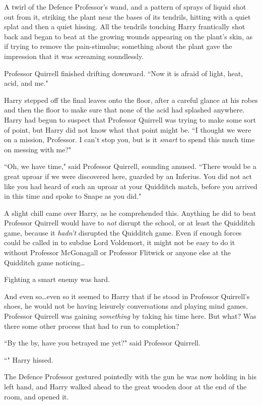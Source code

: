 A twirl of the Defence Professor's wand, and a pattern of sprays of liquid shot out from it, striking the plant near the bases of its tendrils, hitting with a quiet splat and then a quiet hissing. All the tendrils touching Harry frantically shot back and began to beat at the growing wounds appearing on the plant's skin, as if trying to remove the pain-stimulus; something about the plant gave the impression that it was screaming soundlessly.

Professor Quirrell finished drifting downward. ``Now it is afraid of light, heat, acid, and me."

Harry stepped off the final leaves onto the floor, after a careful glance at his robes and then the floor to make sure that none of the acid had splashed anywhere. Harry had begun to suspect that Professor Quirrell was trying to make some sort of point, but Harry did not know what that point might be. ``I thought we were on a mission, Professor. I can't stop you, but is it \emph{smart} to spend this much time on messing with me?"

``Oh, we have time," said Professor Quirrell, sounding amused. ``There would be a great uproar if we were discovered here, guarded by an Inferius. You did not act like you had heard of such an uproar at your Quidditch match, before you arrived in this time and spoke to Snape as you did."

A slight chill came over Harry, as he comprehended this. Anything he did to beat Professor Quirrell would have to \emph{not} disrupt the school, or at least the Quidditch game, because it \emph{hadn't} disrupted the Quidditch game. Even if enough forces could be called in to subdue Lord Voldemort, it might not be easy to do it without Professor McGonagall or Professor Flitwick or anyone else at the Quidditch game noticing…

Fighting a smart enemy was hard.

And even so…even so it seemed to Harry that if he stood in Professor Quirrell's shoes, he would not be having leisurely conversations and playing mind games. Professor Quirrell was gaining \emph{something} by taking his time here. But what? Was there some other process that had to run to completion?

``By the by, have you betrayed me yet?" said Professor Quirrell.

``" Harry hissed.

The Defence Professor gestured pointedly with the gun he was now holding in his left hand, and Harry walked ahead to the great wooden door at the end of the room, and opened it.

